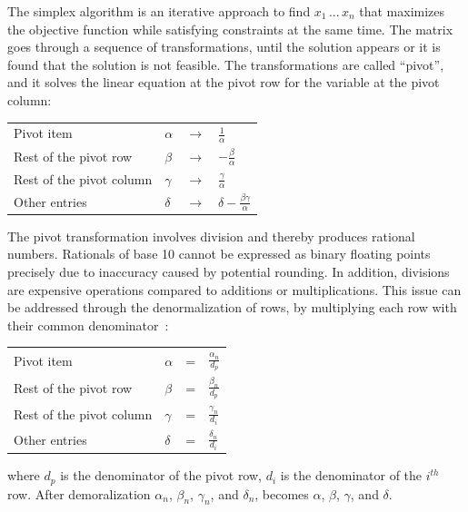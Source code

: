 \documentclass[logo,bsc,singlespacing,parskip]{infthesis}
\begin{document}
    
The simplex algorithm is an iterative approach to find \begin{math} x_1 \, ... \, x_n\end{math} that maximizes the objective function while satisfying constraints at the same time. The matrix goes through a sequence of transformations, until the solution appears or it is found that the solution is not feasible. The transformations are called ``pivot'', and it solves the linear equation at the pivot row for the variable at the pivot column: 
\vspace*{-4mm}
\begin{table}[H]
\begin{center}
\begin{tabular}{llll}
Pivot item           & $\alpha$ & $\rightarrow$ & $\frac{1}{\alpha}$            \\
Rest of the pivot row    & $\beta$  & $\rightarrow$ & $-\frac{\beta}{\alpha}$            \\
Rest of the pivot column& $\gamma$ & $\rightarrow$ & $\frac{\gamma}{\alpha}$            \\
Other entries         & $\delta$ & $\rightarrow$ & $\delta - \frac{\beta\gamma}{\alpha}$  
\end{tabular}
\end{center}
\end{table}
\vspace*{-4mm}

The pivot transformation involves division and thereby produces rational numbers. Rationals of base 10 cannot be expressed as binary floating points precisely due to inaccuracy caused by potential rounding. In addition, divisions are expensive operations compared to additions or multiplications. This issue can be addressed through the denormalization of rows, by multiplying each row with their common denominator~\cite{FPL1}: 

\vspace*{-4mm}
\begin{table}[H]
\begin{center}
\begin{tabular}{llll}
Pivot item           & $\alpha$ & = & $\frac{\alpha_n}{d_p}$            \\
Rest of the pivot row    & $\beta$  & = & $\frac{\beta_n}{d_p}$            \\
Rest of the pivot column& $\gamma$ & = & $\frac{\gamma_n}{d_i}$            \\
Other entries         & $\delta$ & = & $\frac{\delta_n}{d_i}$  
\end{tabular}
\end{center}
\end{table}
\vspace*{-8mm}
where $d_p$ is the denominator of the pivot row, $d_i$ is the denominator of the $i^{th}$ row. After demoralization $\alpha_n$, $\beta_n$, $\gamma_n$, and $\delta_n$, becomes $\alpha$, $\beta$, $\gamma$, and $\delta$.
\end{document}

